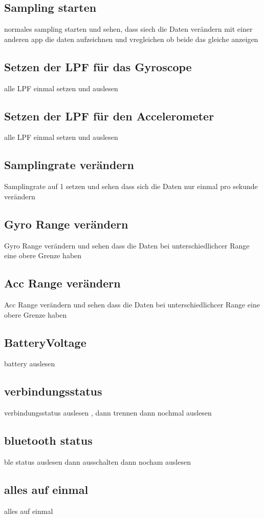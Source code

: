 \documentclass[a4paper,12pt]{article}
\begin{document}
\subsection{Sampling starten}
normales sampling starten und sehen, dass siech die Daten verändern
mit einer anderen app die daten aufzeichnen und vregleichen ob beide das gleiche anzeigen
\subsection{Setzen der LPF für das Gyroscope}
alle LPF einmal setzen und auslesen
\subsection{Setzen der LPF für den Accelerometer}
alle LPF einmal setzen und auslesen
\subsection{Samplingrate verändern}
Samplingrate auf 1 setzen und sehen dass sich die Daten nur einmal pro sekunde verändern
\subsection{Gyro Range verändern}
Gyro Range verändern und sehen dass die Daten bei unterschiedlichcer Range eine obere Grenze haben
\subsection{Acc Range verändern}
Acc Range verändern und sehen dass die Daten bei unterschiedlichcer Range eine obere Grenze haben
\subsection{BatteryVoltage}
battery auslesen
\subsection{verbindungsstatus}
verbindungsstatus auslesen , dann trennen dann nochmal auslesen
\subsection{bluetooth status}
ble status auslesen dann ausschalten dann nocham auslesen
\subsection{alles auf einmal}
alles auf einmal
\end{document}
